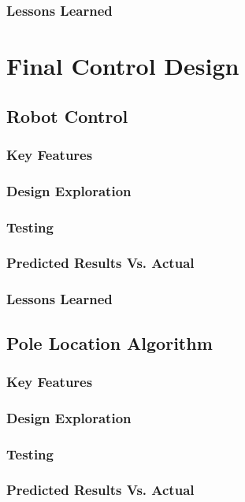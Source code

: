 \documentclass[ece]{uw-wkrpt}
\let\oldsection\section
\renewcommand\section{\clearpage\oldsection}
\begin{document}
\subsubsection{Lessons Learned}

% 
\section{Final Control Design}

% 
\subsection{Robot Control}
\subsubsection{Key Features}
\subsubsection{Design Exploration}
\subsubsection{Testing}
\subsubsection{Predicted Results Vs. Actual}
\subsubsection{Lessons Learned}

% 
\subsection{Pole Location Algorithm}
\subsubsection{Key Features}
\subsubsection{Design Exploration}
\subsubsection{Testing}
\subsubsection{Predicted Results Vs. Actual}
\end{document}
